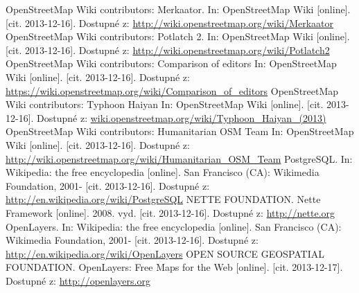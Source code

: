 \documentclass[11pt,a4paper,titlepage,oneside]{book}
\begin{document}
\begin{thebibliography}{50}
	OpenStreetMap Wiki contributors: Merkaator. In: OpenStreetMap Wiki [online]. [cit. 2013-12-16]. Dostupné z:  \url{http://wiki.openstreetmap.org/wiki/Merkaator}
	OpenStreetMap Wiki contributors: Potlatch 2. In: OpenStreetMap Wiki [online]. [cit. 2013-12-16]. Dostupné z:  \url{http://wiki.openstreetmap.org/wiki/Potlatch2}
	OpenStreetMap Wiki contributors: Comparison of editors In: OpenStreetMap Wiki [online]. [cit. 2013-12-16]. Dostupné z:	\url{https://wiki.openstreetmap.org/wiki/Comparison_of_editors}
	OpenStreetMap Wiki contributors: Typhoon Haiyan In: OpenStreetMap Wiki [online]. [cit. 2013-12-16]. Dostupné z: \url{wiki.openstreetmap.org/wiki/Typhoon_Haiyan_(2013)}
	OpenStreetMap Wiki contributors: Humanitarian OSM Team  In: OpenStreetMap Wiki [online]. [cit. 2013-12-16]. Dostupné z: \url{http://wiki.openstreetmap.org/wiki/Humanitarian_OSM_Team}
	PostgreSQL. In: Wikipedia: the free encyclopedia [online]. San Francisco (CA): Wikimedia Foundation, 2001- [cit. 2013-12-16]. Dostupné z: \url{http://en.wikipedia.org/wiki/PostgreSQL}
	NETTE FOUNDATION. Nette Framework [online]. 2008. vyd. [cit. 2013-12-16]. Dostupné z: \url{http://nette.org} 
	OpenLayers. In: Wikipedia: the free encyclopedia [online]. San Francisco (CA): Wikimedia Foundation, 2001- [cit. 2013-12-16]. Dostupné z: \url{http://en.wikipedia.org/wiki/OpenLayers}
	OPEN SOURCE GEOSPATIAL FOUNDATION. OpenLayers: Free Maps for the Web [online]. [cit. 2013-12-17]. Dostupné z: \url{http://openlayers.org} 

\end{thebibliography}
\end{document}

